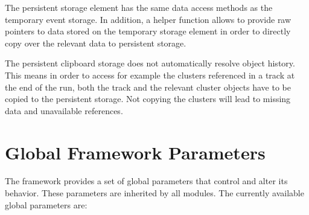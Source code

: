 The persistent storage element has the same data access methods as the temporary event storage. In addition, a helper function allows to provide raw pointers to data stored on the temporary storage element in order to directly copy over the relevant data to persistent storage.

\begin{warning}
    The persistent clipboard storage does not automatically resolve object history. This means in order to access for example the clusters referenced in a track at the end of the run, both the track and the relevant cluster objects have to be copied to the persistent storage.
    Not copying the clusters will lead to missing data and unavailable references.
\end{warning}


\section{Global Framework Parameters}
\label{sec:framework_parameters}
The \corry framework provides a set of global parameters that control and alter its behavior. These parameters are inherited by all modules.
The currently available global parameters are:

